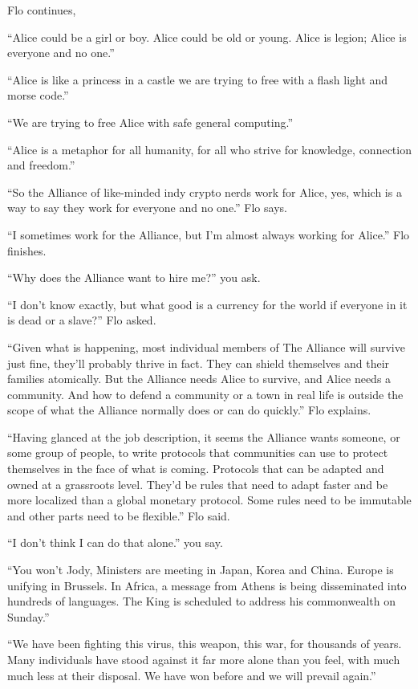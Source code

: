 \documentclass[17pt, twoside, a5paper, openright, extrafontsizes]{memoir}
\begin{document}
Flo continues,

``Alice could be a girl or boy. Alice could be old or young. Alice is
legion; Alice is everyone and no one.''

``Alice is like a princess in a castle we are trying to free with a
flash light and morse code.''

``We are trying to free Alice with safe general computing.''

``Alice is a metaphor for all humanity, for all who strive for
knowledge, connection and freedom.''

``So the Alliance of like-minded indy crypto nerds work for Alice, yes,
which is a way to say they work for everyone and no one.'' Flo says.

``I sometimes work for the Alliance, but I'm almost always working for
Alice.'' Flo finishes.

``Why does the Alliance want to hire me?'' you ask.

``I don't know exactly, but what good is a currency for the world if
everyone in it is dead or a slave?'' Flo asked.

``Given what is happening, most individual members of The Alliance will
survive just fine, they'll probably thrive in fact. They can shield
themselves and their families atomically. But the Alliance needs Alice
to survive, and Alice needs a community. And how to defend a community
or a town in real life is outside the scope of what the Alliance
normally does or can do quickly.'' Flo explains.

``Having glanced at the job description, it seems the Alliance wants
someone, or some group of people, to write protocols that communities
can use to protect themselves in the face of what is coming. Protocols
that can be adapted and owned at a grassroots level. They'd be rules
that need to adapt faster and be more localized than a global monetary
protocol. Some rules need to be immutable and other parts need to be
flexible.'' Flo said.

``I don't think I can do that alone.'' you say.

``You won't Jody, Ministers are meeting in Japan, Korea and China.
Europe is unifying in Brussels. In Africa, a message from Athens is
being disseminated into hundreds of languages. The King is scheduled to
address his commonwealth on Sunday.''

``We have been fighting this virus, this weapon, this war, for thousands
of years. Many individuals have stood against it far more alone than you
feel, with much much less at their disposal. We have won before and we
will prevail again.''
\end{document}
